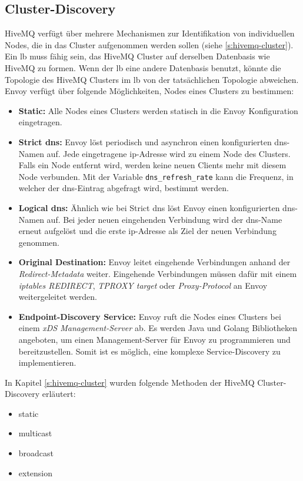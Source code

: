 \subsection{Cluster-Discovery} \label{ss:cluster-discovery}
HiveMQ verfügt über mehrere Mechanismen zur Identifikation von individuellen Nodes, die in das Cluster aufgenommen werden sollen (siehe \ref{s:hivemq-cluster}).
Ein \acl{lb} muss fähig sein, das HiveMQ Cluster auf derselben Datenbasis wie HiveMQ zu formen.
Wenn der \ac{lb} eine andere Datenbasis benutzt, könnte die Topologie des HiveMQ Clusters im \ac{lb} von der tatsächlichen Topologie abweichen.\\
Envoy verfügt über folgende Möglichkeiten, Nodes eines Clusters zu bestimmen:
\begin{itemize}
  \item \textbf{Static:} Alle Nodes eines Clusters werden statisch in die Envoy Konfiguration eingetragen.
  \item \textbf{Strict \ac{dns}:} Envoy löst periodisch und asynchron einen konfigurierten \ac{dns}-Namen auf. Jede eingetragene \ac{ip}-Adresse wird zu einem Node des Clusters. Falls ein Node entfernt wird, werden keine neuen Clients mehr mit diesem Node verbunden. Mit der Variable \verb|dns_refresh_rate| kann die Frequenz, in welcher der \ac{dns}-Eintrag abgefragt wird, bestimmt werden.
  \item \textbf{Logical \ac{dns}:} Ähnlich wie bei Strict \ac{dns} löst Envoy einen konfigurierten \ac{dns}-Namen auf. Bei jeder neuen eingehenden Verbindung wird der \ac{dns}-Name erneut aufgelöst und die erste \ac{ip}-Adresse als Ziel der neuen Verbindung genommen.
  \item \textbf{Original Destination:} Envoy leitet eingehende Verbindungen anhand der \textit{Redirect-Metadata} weiter. Eingehende Verbindungen müssen dafür mit einem \textit{iptables REDIRECT}, \textit{TPROXY target} oder \textit{Proxy-Protocol} an Envoy weitergeleitet werden.
  \item \textbf{Endpoint-Discovery Service:} Envoy ruft die Nodes eines Clusters bei einem \textit{xDS Management-Server} ab. Es werden Java und Golang Bibliotheken angeboten, um einen Management-Server für Envoy zu programmieren und bereitzustellen. Somit ist es möglich, eine komplexe Service-Discovery zu implementieren.
\end{itemize}
\cite{ServiceDiscoveryEnvoy}
In Kapitel \ref{s:hivemq-cluster} wurden folgende Methoden der HiveMQ Cluster-Discovery erläutert:
\begin{itemize}
  \item static
  \item multicast
  \item broadcast
  \item extension
\end{itemize}

